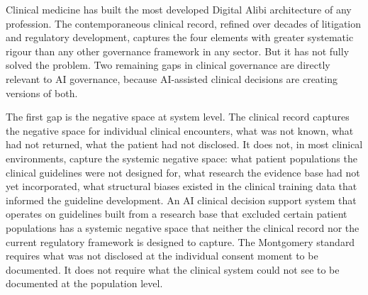 Clinical medicine has built the most developed Digital Alibi architecture of any profession. The contemporaneous clinical record, refined over decades of litigation and regulatory development, captures the four elements with greater systematic rigour than any other governance framework in any sector. But it has not fully solved the problem. Two remaining gaps in clinical governance are directly relevant to AI governance, because AI-assisted clinical decisions are creating versions of both.

The first gap is the negative space at system level. The clinical record captures the negative space for individual clinical encounters, what was not known, what had not returned, what the patient had not disclosed. It does not, in most clinical environments, capture the systemic negative space: what patient populations the clinical guidelines were not designed for, what research the evidence base had not yet incorporated, what structural biases existed in the clinical training data that informed the guideline development. An AI clinical decision support system that operates on guidelines built from a research base that excluded certain patient populations has a systemic negative space that neither the clinical record nor the current regulatory framework is designed to capture. The Montgomery standard requires what was not disclosed at the individual consent moment to be documented. It does not require what the clinical system could not see to be documented at the population level.


